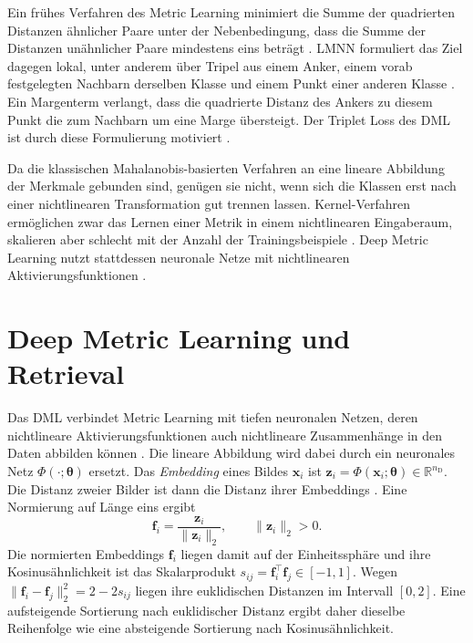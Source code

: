 Ein frühes Verfahren des Metric Learning minimiert die Summe der quadrierten Distanzen ähnlicher Paare unter der Nebenbedingung, dass die Summe der Distanzen unähnlicher Paare mindestens eins beträgt \cite{xing_distance_2002}. \ac{LMNN} formuliert das Ziel dagegen lokal, unter anderem über Tripel aus einem Anker, einem vorab festgelegten Nachbarn derselben Klasse und einem Punkt einer anderen Klasse \cite{weinberger_distance_2009}. Ein Margenterm verlangt, dass die quadrierte Distanz des Ankers zu diesem Punkt die zum Nachbarn um eine Marge übersteigt. Der Triplet Loss des \ac{DML} ist durch diese Formulierung motiviert \cite{schroff_facenet_2015}.

Da die klassischen Mahalanobis-basierten Verfahren an eine lineare Abbildung der Merkmale gebunden sind, genügen sie nicht, wenn sich die Klassen erst nach einer nichtlinearen Transformation gut trennen lassen. Kernel-Verfahren ermöglichen zwar das Lernen einer Metrik in einem nichtlinearen Eingaberaum, skalieren aber schlecht mit der Anzahl der Trainingsbeispiele \cite{bellet_survey_2014}. Deep Metric Learning nutzt stattdessen neuronale Netze mit nichtlinearen Aktivierungsfunktionen \cite{kaya_deep_2019}. 

\section{Deep Metric Learning und Retrieval}
\label{sec:dml}

 Das \acl{DML} verbindet Metric Learning mit tiefen neuronalen Netzen, deren nichtlineare Aktivierungsfunktionen auch nichtlineare Zusammenhänge in den Daten abbilden können \cite{kaya_deep_2019, musgrave_metric_2020}. Die lineare Abbildung wird dabei durch ein neuronales Netz $\Phi(\cdot;\bm{\theta})$ ersetzt. Das \emph{Embedding} eines Bildes $\bm{x}_i$ ist $\bm{z}_i=\Phi(\bm{x}_i;\bm{\theta})\in\mathbb{R}^{n_{\mathrm{D}}}$. Die Distanz zweier Bilder ist dann die Distanz ihrer Embeddings \cite{mohan_deep_2023, hadsell_dimensionality_2006}. 
 Eine Normierung auf Länge eins ergibt \cite{schroff_facenet_2015}
\begin{equation}
	\bm{f}_i=\frac{\bm{z}_i}{\lVert\bm{z}_i\rVert_2},\qquad \lVert\bm{z}_i\rVert_2>0.
\end{equation}
Die normierten Embeddings $\bm{f}_i$ liegen damit auf der Einheitssphäre und ihre Kosinusähnlichkeit ist das Skalarprodukt $s_{ij}=\bm{f}_i^{\top}\bm{f}_j\in[-1,1]$. Wegen $\lVert\bm{f}_i-\bm{f}_j\rVert_2^2=2-2s_{ij}$ liegen ihre euklidischen Distanzen im Intervall $[0,2]$. Eine aufsteigende Sortierung nach euklidischer Distanz ergibt daher dieselbe Reihenfolge wie eine absteigende Sortierung nach Kosinusähnlichkeit.

